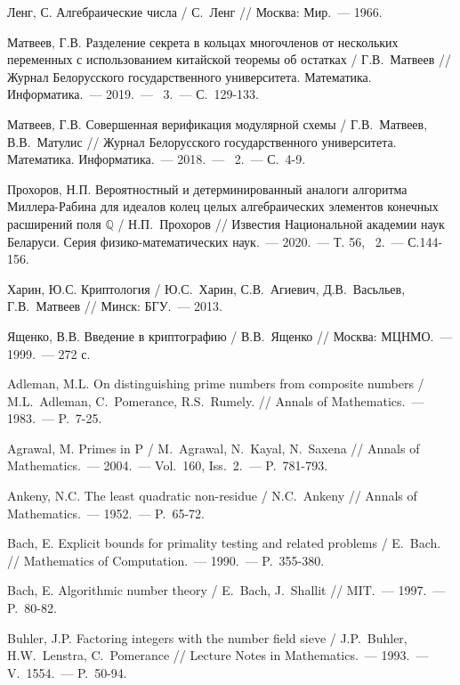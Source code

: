 \documentclass[_00_dissertation.tex]{subfiles}
\begin{document}
\begin{thebibliography}{99}
    Ленг, С. Алгебраические числа / С.~Ленг // Москва: Мир.~--- 1966.

    Матвеев, Г.В. Разделение секрета в кольцах многочленов от нескольких переменных с использованием китайской теоремы об остатках / Г.В.~Матвеев // Журнал Белорусского государственного университета. Математика. Информатика.~--- 2019.~--- \textnumero~3.~--- С.~129-133.
    
    Матвеев, Г.В. Совершенная верификация модулярной схемы / Г.В.~Матвеев, В.В.~Матулис // Журнал Белорусского государственного университета. Математика. Информатика.~--- 2018.~--- \textnumero~2.~--- С.~4-9.

    Прохоров, Н.П. Вероятностный и детерминированный аналоги алгоритма Миллера-Рабина для идеалов колец целых алгебраических элементов конечных расширений поля $\mathbb{Q}$ / Н.П.~Прохоров // Известия Национальной академии наук Беларуси. Серия физико-математических наук.~--- 2020.~--- Т. 56, \textnumero~2.~--- С.144-156.
    
    Харин, Ю.С. Криптология / Ю.С.~Харин, С.В.~Агиевич, Д.В.~Васьльев, Г.В.~Матвеев // Минск: БГУ.~--- 2013.

    Ященко, В.В. Введение в криптографию / В.В.~Ященко // Москва: МЦНМО.~--- 1999.~--- 272 с.

    Adleman, M.L. On distinguishing prime numbers from composite numbers / M.L.~Adleman, C.~Pomerance, R.S.~Rumely. // Annals of Mathematics.~--- 1983.~--- P.~7-25.

    Agrawal, M. Primes in P / M.~Agrawal, N.~Kayal, N.~Saxena // Annals of Mathematics.~--- 2004.~--- Vol.~160, Iss.~2.~--- P.~781-793.

    Ankeny, N.C. The least quadratic non-residue / N.C.~Ankeny // Annals of Mathematics.~--- 1952.~--- P.~65-72.

    Bach, E. Explicit bounds for primality testing and related problems / E.~Bach. // Mathematics of Computation.~--- 1990.~--- P.~355-380.

    Bach, E. Algorithmic number theory / E.~Bach, J.~Shallit // MIT.~--- 1997.~--- P.~80-82.

    Buhler, J.P. Factoring integers with the number field sieve / J.P.~Buhler, H.W.~Lenstra, C.~Pomerance // Lecture Notes in Mathematics.~--- 1993.~--- V.~1554.~--- P.~50-94.


\end{thebibliography}
\end{document}
